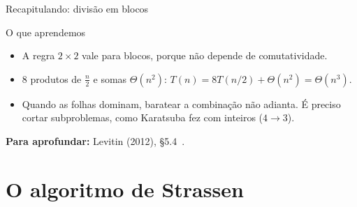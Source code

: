 \documentclass[aspectratio=169,xcolor=table]{beamer}
\newcommand{\fonte}[1]{%
  \vfill
  {\tiny\color{gray!55!black}\textbf{Para aprofundar:} #1\par}%
}
\begin{document}
\begin{frame}{Recapitulando: divisão em blocos}
  \begin{block}{O que aprendemos}
    \begin{itemize}\scriptsize
      \item A regra $2\times 2$ vale para blocos, porque não depende de comutatividade.
      \item 8 produtos de $\frac n2$ e somas $\Theta(n^2)$: $T(n)=8T(n/2)+\Theta(n^2)=\Theta(n^3)$.
      \item Quando as folhas dominam, baratear a combinação não adianta. É preciso cortar
            subproblemas, como Karatsuba fez com inteiros ($4\to 3$).
    \end{itemize}
  \end{block}
  \fonte{Levitin (2012), \S 5.4~\cite{levitin2012introduction}.}
\end{frame}

\section{O algoritmo de Strassen}
\end{document}

